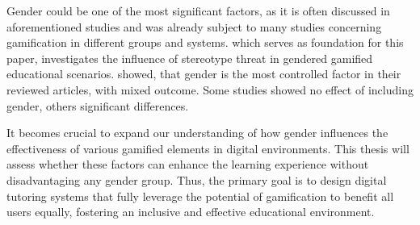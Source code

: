 Gender could be one of the most significant factors, as it is often discussed in aforementioned studies and was already subject to many studies concerning gamification in different groups and systems.
\textcite{albuquerqueDoesGenderStereotype2017} which serves as foundation for this paper, investigates the influence of stereotype threat in gendered gamified educational scenarios.
\textcite{dehghanzadehUsingGamificationSupport2024} showed, that gender is the most controlled factor in their reviewed articles, with mixed outcome. Some studies showed no effect of including gender, others significant differences.

It becomes crucial to expand our understanding of how gender influences the effectiveness of various gamified elements in digital environments. This thesis will assess whether these factors can enhance the learning experience without disadvantaging any gender group.
Thus, the primary goal is to design digital tutoring systems that fully leverage the potential of gamification to benefit all users equally, fostering an inclusive and effective educational environment.